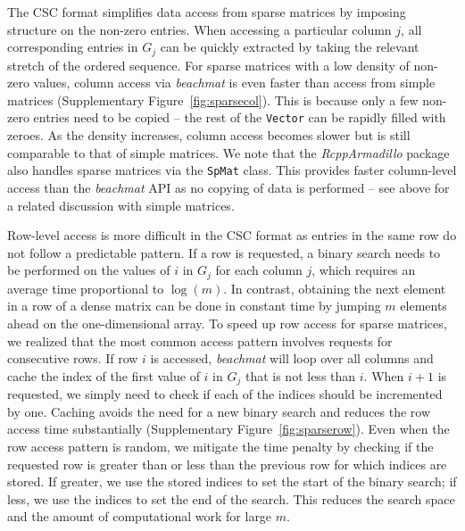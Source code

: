 \documentclass{article}
\newcommand{\beachmat}{\textit{beachmat}}
\newcommand{\code}[1]{\texttt{#1}}
\begin{document}
The CSC format simplifies data access from sparse matrices by imposing structure on the non-zero entries.
When accessing a particular column $j$, all corresponding entries in $G_j$ can be quickly extracted by taking the relevant stretch of the ordered sequence.
For sparse matrices with a low density of non-zero values, column access via \beachmat{} is even faster than access from simple matrices (Supplementary Figure~\ref{fig:sparsecol}).
This is because only a few non-zero entries need to be copied -- the rest of the \code{Vector} can be rapidly filled with zeroes.
As the density increases, column access becomes slower but is still comparable to that of simple matrices.
We note that the \textit{RcppArmadillo} package \cite{eddelbuettel2014arma} also handles sparse matrices via the \code{SpMat} class.
This provides faster column-level access than the \beachmat{} API as no copying of data is performed -- see above for a related discussion with simple matrices.

Row-level access is more difficult in the CSC format as entries in the same row do not follow a predictable pattern.
If a row is requested, a binary search needs to be performed on the values of $i$ in $G_j$ for each column $j$, which requires an average time proportional to $\log(m)$.
In contrast, obtaining the next element in a row of a dense matrix can be done in constant time by jumping $m$ elements ahead on the one-dimensional array.
To speed up row access for sparse matrices, we realized that the most common access pattern involves requests for consecutive rows.
If row $i$ is accessed, \beachmat{} will loop over all columns and cache the index of the first value of $i$ in $G_j$ that is not less than $i$.
When $i+1$ is requested, we simply need to check if each of the indices should be incremented by one.
Caching avoids the need for a new binary search and reduces the row access time substantially (Supplementary Figure~\ref{fig:sparserow}).
Even when the row access pattern is random, we mitigate the time penalty by checking if the requested row is greater than or less than the previous row for which indices are stored.
If greater, we use the stored indices to set the start of the binary search; if less, we use the indices to set the end of the search. 
This reduces the search space and the amount of computational work for large $m$.

\end{document}
